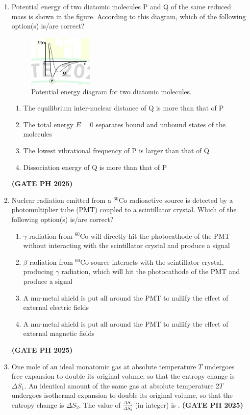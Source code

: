 \documentclass[14pt, a4paper]{extarticle}
\begin{document}
\begin{enumerate}[label=\textbf{Q.\arabic*}]
\item Potential energy of two diatomic molecules P and Q of the same reduced mass is shown in the figure. According to this diagram, which of the following option(s) is/are correct?
\begin{figure}[H]
\centering
\includegraphics[width=0.3\textwidth]{figs/q28fig25.png}
\caption{Potential energy diagram for two diatomic molecules.}
\label{fig:q28_potential_energy}
\end{figure}
\begin{enumerate}
\item The equilibrium inter-nuclear distance of Q is more than that of P
\item The total energy $E=0$ separates bound and unbound states of the molecules
\item The lowest vibrational frequency of P is larger than that of Q
\item Dissociation energy of Q is more than that of P
\end{enumerate}
\hfill \textbf{(GATE PH 2025)}

\item Nuclear radiation emitted from a $^{60}$Co radioactive source is detected by a photomultiplier tube (PMT) coupled to a scintillator crystal. Which of the following option(s) is/are correct?
\begin{enumerate}
\item $\gamma$ radiation from $^{60}$Co will directly hit the photocathode of the PMT without interacting with the scintillator crystal and produce a signal
\item $\beta$ radiation from $^{60}$Co source interacts with the scintillator crystal, producing $\gamma$ radiation, which will hit the photocathode of the PMT and produce a signal
\item A mu-metal shield is put all around the PMT to nullify the effect of external electric fields
\item A mu-metal shield is put all around the PMT to nullify the effect of external magnetic fields
\end{enumerate}
\hfill \textbf{(GATE PH 2025)}

\item One mole of an ideal monatomic gas at absolute temperature $T$ undergoes free expansion to double its original volume, so that the entropy change is $\Delta S_1$. An identical amount of the same gas at absolute temperature $2T$ undergoes isothermal expansion to double its original volume, so that the entropy change is $\Delta S_2$. The value of $\frac{\Delta S_1}{\Delta S_2}$ (in integer) is \underline{\hspace{3cm}}.
\hfill \textbf{(GATE PH 2025)}


\end{enumerate}
\end{document}
